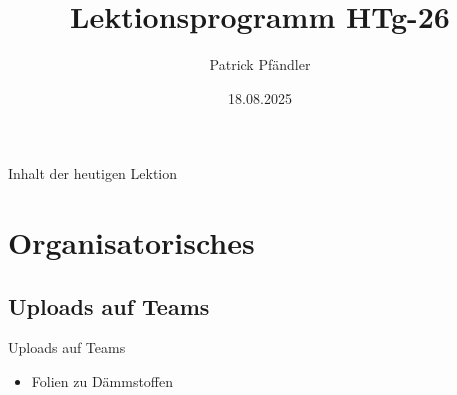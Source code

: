 



\title{\textbf{Lektionsprogramm HTg-26}}
\author{Patrick Pfändler}
\date{18.08.2025}




\frame{\titlepage}





\begin{frame}{Inhalt der heutigen Lektion}
    \tableofcontents
\end{frame}


\section{Organisatorisches}
\BlueSectionSlide

\subsection{Uploads auf Teams}
\begin{frame}{Uploads auf Teams}
    \begin{itemize}
        \item[\textbullet] Folien zu Dämmstoffen
    \end{itemize}

\end{frame}


